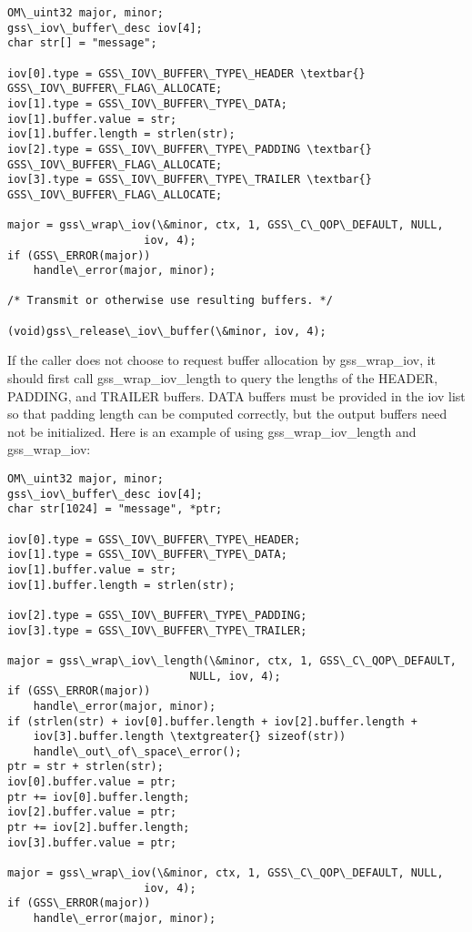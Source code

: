 \documentclass[letterpaper,10pt,english]{sphinxmanual}
\begin{document}
\begin{Verbatim}[commandchars=\\\{\}]
OM\_uint32 major, minor;
gss\_iov\_buffer\_desc iov[4];
char str[] = "message";

iov[0].type = GSS\_IOV\_BUFFER\_TYPE\_HEADER \textbar{} GSS\_IOV\_BUFFER\_FLAG\_ALLOCATE;
iov[1].type = GSS\_IOV\_BUFFER\_TYPE\_DATA;
iov[1].buffer.value = str;
iov[1].buffer.length = strlen(str);
iov[2].type = GSS\_IOV\_BUFFER\_TYPE\_PADDING \textbar{} GSS\_IOV\_BUFFER\_FLAG\_ALLOCATE;
iov[3].type = GSS\_IOV\_BUFFER\_TYPE\_TRAILER \textbar{} GSS\_IOV\_BUFFER\_FLAG\_ALLOCATE;

major = gss\_wrap\_iov(\&minor, ctx, 1, GSS\_C\_QOP\_DEFAULT, NULL,
                     iov, 4);
if (GSS\_ERROR(major))
    handle\_error(major, minor);

/* Transmit or otherwise use resulting buffers. */

(void)gss\_release\_iov\_buffer(\&minor, iov, 4);
\end{Verbatim}

If the caller does not choose to request buffer allocation by
gss\_wrap\_iov, it should first call gss\_wrap\_iov\_length to query the
lengths of the HEADER, PADDING, and TRAILER buffers.  DATA buffers
must be provided in the iov list so that padding length can be
computed correctly, but the output buffers need not be initialized.
Here is an example of using gss\_wrap\_iov\_length and gss\_wrap\_iov:

\begin{Verbatim}[commandchars=\\\{\}]
OM\_uint32 major, minor;
gss\_iov\_buffer\_desc iov[4];
char str[1024] = "message", *ptr;

iov[0].type = GSS\_IOV\_BUFFER\_TYPE\_HEADER;
iov[1].type = GSS\_IOV\_BUFFER\_TYPE\_DATA;
iov[1].buffer.value = str;
iov[1].buffer.length = strlen(str);

iov[2].type = GSS\_IOV\_BUFFER\_TYPE\_PADDING;
iov[3].type = GSS\_IOV\_BUFFER\_TYPE\_TRAILER;

major = gss\_wrap\_iov\_length(\&minor, ctx, 1, GSS\_C\_QOP\_DEFAULT,
                            NULL, iov, 4);
if (GSS\_ERROR(major))
    handle\_error(major, minor);
if (strlen(str) + iov[0].buffer.length + iov[2].buffer.length +
    iov[3].buffer.length \textgreater{} sizeof(str))
    handle\_out\_of\_space\_error();
ptr = str + strlen(str);
iov[0].buffer.value = ptr;
ptr += iov[0].buffer.length;
iov[2].buffer.value = ptr;
ptr += iov[2].buffer.length;
iov[3].buffer.value = ptr;

major = gss\_wrap\_iov(\&minor, ctx, 1, GSS\_C\_QOP\_DEFAULT, NULL,
                     iov, 4);
if (GSS\_ERROR(major))
    handle\_error(major, minor);
\end{Verbatim}
\end{document}
